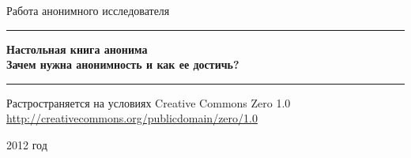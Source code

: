 \begin{titlepage}

\begin{center}
Работа анонимного исследователя
\vspace{10em}

\rule{\linewidth}{0.5mm}
\LARGE \textbf{Настольная книга анонима}\\
\Large \textbf{Зачем нужна анонимность и как ее достичь?}
\rule{\linewidth}{0.5mm}
\vfill
\normalsize Растространяется на условиях Creative Commons Zero 1.0\\
\url{http://creativecommons.org/publicdomain/zero/1.0}\\
\begin{figure}[h]
\end{figure}
2012 год
\end{center}

\end{titlepage}
